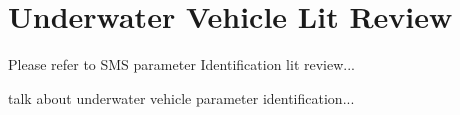 \section{Underwater Vehicle Lit Review}
\label{chUV_AID.litReview}

Please refer to SMS parameter Identification lit review...

talk about underwater vehicle parameter identification...

